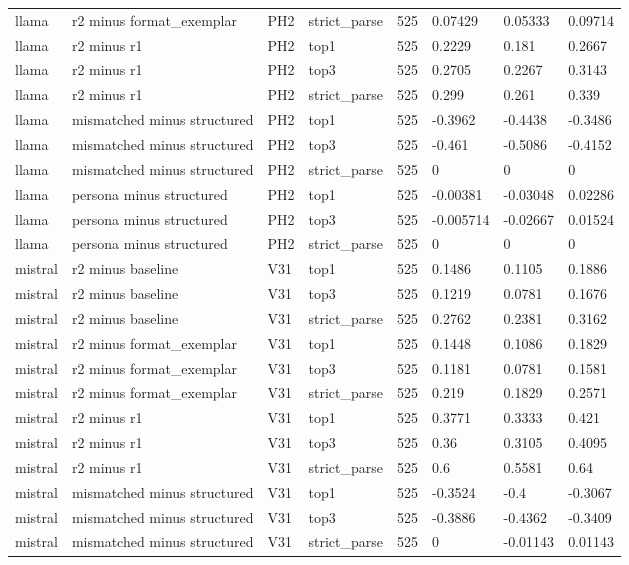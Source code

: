 \begin{tabular}{llllllll}
llama & r2 minus format\_exemplar & PH2 & strict\_parse & 525 & 0.07429 & 0.05333 & 0.09714 \\
llama & r2 minus r1 & PH2 & top1 & 525 & 0.2229 & 0.181 & 0.2667 \\
llama & r2 minus r1 & PH2 & top3 & 525 & 0.2705 & 0.2267 & 0.3143 \\
llama & r2 minus r1 & PH2 & strict\_parse & 525 & 0.299 & 0.261 & 0.339 \\
llama & mismatched minus structured & PH2 & top1 & 525 & -0.3962 & -0.4438 & -0.3486 \\
llama & mismatched minus structured & PH2 & top3 & 525 & -0.461 & -0.5086 & -0.4152 \\
llama & mismatched minus structured & PH2 & strict\_parse & 525 & 0 & 0 & 0 \\
llama & persona minus structured & PH2 & top1 & 525 & -0.00381 & -0.03048 & 0.02286 \\
llama & persona minus structured & PH2 & top3 & 525 & -0.005714 & -0.02667 & 0.01524 \\
llama & persona minus structured & PH2 & strict\_parse & 525 & 0 & 0 & 0 \\
mistral & r2 minus baseline & V31 & top1 & 525 & 0.1486 & 0.1105 & 0.1886 \\
mistral & r2 minus baseline & V31 & top3 & 525 & 0.1219 & 0.0781 & 0.1676 \\
mistral & r2 minus baseline & V31 & strict\_parse & 525 & 0.2762 & 0.2381 & 0.3162 \\
mistral & r2 minus format\_exemplar & V31 & top1 & 525 & 0.1448 & 0.1086 & 0.1829 \\
mistral & r2 minus format\_exemplar & V31 & top3 & 525 & 0.1181 & 0.0781 & 0.1581 \\
mistral & r2 minus format\_exemplar & V31 & strict\_parse & 525 & 0.219 & 0.1829 & 0.2571 \\
mistral & r2 minus r1 & V31 & top1 & 525 & 0.3771 & 0.3333 & 0.421 \\
mistral & r2 minus r1 & V31 & top3 & 525 & 0.36 & 0.3105 & 0.4095 \\
mistral & r2 minus r1 & V31 & strict\_parse & 525 & 0.6 & 0.5581 & 0.64 \\
mistral & mismatched minus structured & V31 & top1 & 525 & -0.3524 & -0.4 & -0.3067 \\
mistral & mismatched minus structured & V31 & top3 & 525 & -0.3886 & -0.4362 & -0.3409 \\
mistral & mismatched minus structured & V31 & strict\_parse & 525 & 0 & -0.01143 & 0.01143 \\

\end{tabular}
